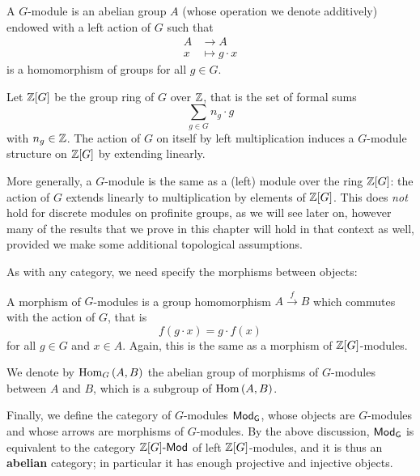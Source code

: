 \documentclass[a4paper, oneside]{memoir}
\begin{document}
\begin{definition}
	A $G$-module is an abelian group $A$ (whose operation we denote additively) endowed with a left action of $G$ such that
	\begin{align*}
		A & \longrightarrow A    \\
		x & \longmapsto g\cdot x
	\end{align*}
	is a homomorphism of groups for all $g\in G$.
\end{definition}

\begin{remark}
	Let $\mathbb{Z}[G]$ be the group ring of $G$ over $\mathbb{Z}$, that is the set of formal sums
	\[
		\sum_{g\in G}{n_g\cdot g}
	\]
	with $n_g\in\mathbb{Z}$. The action of $G$ on itself by left multiplication induces a $G$-module structure on $\mathbb{Z}[G]$ by extending linearly.

	More generally, a $G$-module is the same as a (left) module over the ring $\mathbb{Z}[G]$: the action of $G$ extends linearly to multiplication by elements of $\mathbb{Z}[G]$. This does \textit{not} hold for discrete modules on profinite groups, as we will see later on, however many of the results that we prove in this chapter will hold in that context as well, provided we make some additional topological assumptions.
\end{remark}

As with any category, we need specify the morphisms between objects:

\begin{definition}
	A morphism of $G$-modules is a group homomorphism $A\overset{f}{\to} B$ which commutes with the action of $G$, that is
	\[
		f(g\cdot x)=g\cdot f(x)
	\]
	for all $g\in G$ and $x\in A$. Again, this is the same as a morphism of $\mathbb{Z}[G]$-modules.
\end{definition}
\noindent We denote by $\operatorname{Hom}_G{(A,B)}$ the abelian group of morphisms of $G$-modules between $A$ and $B$, which is a subgroup of $\operatorname{Hom}{(A,B)}$.

\medskip Finally, we define the category of $G$-modules $\mathsf{Mod}_\mathsf{G}$, whose objects are $G$-modules and whose arrows are morphisms of $G$-modules. By the above discussion, $\mathsf{Mod}_\mathsf{G}$ is equivalent to the category $\mathbb{Z}[G]\text{-}\mathsf{Mod}$ of left $\mathbb{Z}[G]$-modules, and it is thus an \textbf{abelian} category; in particular it has enough projective and injective objects.
\end{document}
